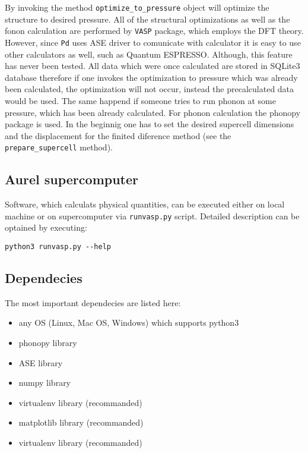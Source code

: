 \documentclass[12pt]{article}
\begin{document}
By invoking the method \texttt{optimize\_to\_pressure}  object will optimize the structure to desired pressure. All of the structural optimizations as well as the fonon calculation are performed by \texttt{VASP}\cite{vasp} package, which employs the DFT theory. However, since \texttt{Pd} uses ASE driver to comunicate with calculator it is easy to use other calculators as well, such as Quantum ESPRESSO\cite{QE}. Although, this feature has never been tested. All data which were once calculated are stored in SQLite3 database\cite{SQL} therefore if one invokes the optimization to pressure which was already been calculated, the optimization will not occur, instead the precalculated data would be used. The same happend if someone tries to run phonon at some pressure, which has been already calculated. For phonon calculation the phonopy package is used. In the beginnig one has to set the desired supercell dimensions and the displacement for the finited diference method (see the \texttt{prepare\_supercell} method).

\subsection{Aurel supercomputer}

Software, which calculats physical quantities, can be executed either on local machine or on supercomputer via \texttt{runvasp.py} script. Detailed description can be optained by executing:

\begin{verbatim}
python3 runvasp.py --help
\end{verbatim}

\subsection{Dependecies}\label{deps}

The most important dependecies are listed here:

\begin{itemize}
  \item any OS (Linux, Mac OS, Windows) which supports python3
  \item phonopy library
  \item ASE library
  \item numpy library
  \item virtualenv library (recommanded)
  \item matplotlib library (recommanded)
  \item virtualenv library (recommanded)
\end{itemize}
\end{document}
